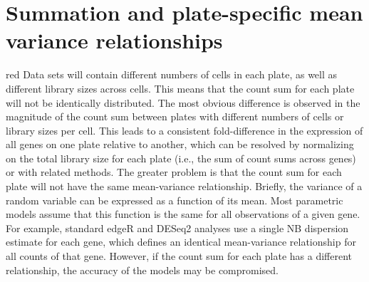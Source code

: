 \documentclass{article}
\begin{document}
\section{Summation and plate-specific mean variance relationships}
\begin{color}{red}
Data sets will contain different numbers of cells in each plate, as well as different library sizes across cells.
This means that the count sum for each plate will not be identically distributed.
The most obvious difference is observed in the magnitude of the count sum between plates with different numbers of cells or library sizes per cell.
This leads to a consistent fold-difference in the expression of all genes on one plate relative to another, which can be resolved by normalizing on the total library size for each plate (i.e., the sum of count sums across genes) or with related methods.
The greater problem is that the count sum for each plate will not have the same mean-variance relationship.
Briefly, the variance of a random variable can be expressed as a function of its mean.
Most parametric models assume that this function is the same for all observations of a given gene.
For example, standard edgeR and DESeq2 analyses use a single NB dispersion estimate for each gene, which defines an identical mean-variance relationship for all counts of that gene.
However, if the count sum for each plate has a different relationship, the accuracy of the models may be compromised.


\end{color}
\end{document}
